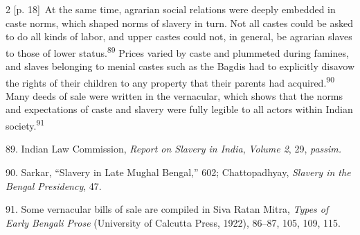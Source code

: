 \documentclass[10pt,a4paper]{article}
\begin{document}
\begin{paracol}{2}
\switchcolumn
{\scriptsize\color{gray} [p. 18]}\ At the same time, agrarian social relations were deeply embedded in caste norms, which shaped norms of slavery in turn. Not all castes could be asked to do all kinds of labor, and upper castes could not, in general, be agrarian slaves to those of lower status.\nobreak\textsuperscript{89} Prices varied by caste and plummeted during famines, and slaves belonging to menial castes such as the Bagdis had to explicitly disavow the rights of their children to any property that their parents had acquired.\nobreak\textsuperscript{90} Many deeds of sale were written in the vernacular, which shows that the norms and expectations of caste and slavery were fully legible to all actors within Indian society.\nobreak\textsuperscript{91}\par{\small 89. Indian Law Commission, \textit{Report on Slavery in India}, \textit{Volume 2}, 29, \textit{passim.}\par}{\small 90. Sarkar, “Slavery in Late Mughal Bengal,” 602; Chattopadhyay, \textit{Slavery in the Bengal Presidency}, 47.\par}{\small 91. Some vernacular bills of sale are compiled in Siva Ratan Mitra, \textit{Types of Early Bengali Prose} (University of Calcutta Press, 1922), 86–87, 105, 109, 115.\par}
\switchcolumn*

\end{paracol}
\end{document}
